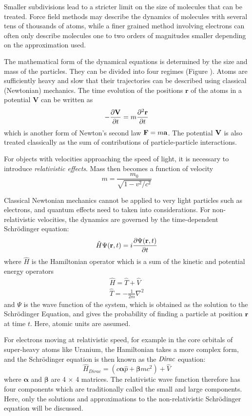 Smaller subdivisions lead to a stricter limit on the size of molecules that can be treated. Force field methods may describe the dynamics of molecules with several tens of thousands of atoms, while a finer grained method involving electrons can often only describe molecules one to two orders of magnitudes smaller depending on the approximation used.

The mathematical form of the dynamical equations is determined by the size and mass of the particles. They can be divided into four regimes (Figure ). Atoms are sufficiently heavy and slow that their trajectories can be described using classical (Newtonian) mechanics. The time evolution of the positions $\mathbf{r}$ of the atoms in a potential $\mathbf{V}$ can be written as
\begin{equation}
-\frac{\partial \mathbf{V}}{\partial t} = m\frac{\partial^2 \mathbf{r}}{\partial t}
\end{equation} 
\noindent which is another form of Newton's second law $\mathbf{F} = m\mathbf{a}$. The potential $\mathbf{V}$ is also treated classically as the sum of contributions of particle-particle interactions.

For objects with velocities approaching the speed of light, it is necessary to introduce \emph{relativistic effects}. Mass then becomes a function of velocity
\begin{equation}
m = \frac{m_0}{\sqrt{1-v^2/c^2}}
\end{equation}

Classical Newtonian mechanics cannot be applied to very light particles such as electrons, and quantum effects need to taken into considerations. For non-relativistic velocities, the dynamics are governed by the time-dependent Schrödinger equation:
\begin{equation}
\hat{H} \Psi(\mathbf{r},t) = i \frac{\partial \Psi(\mathbf{r},t)}{\partial t}
\end{equation}
\noindent where $\hat{H}$ is the Hamiltonian operator which is a sum of the kinetic and potential energy operators
\begin{align}
\hat{H} = \hat{T} + \hat{V} \\
\hat{T} = -\frac{1}{2m} \nabla^2
\end{align}
\noindent and $\Psi$ is the wave function of the system, which is obtained as the solution to the Schrödinger Equation, and gives the probability of finding a particle at position $\mathbf{r}$ at time $t$. Here, atomic units are assumed.

For electrons moving at relativistic speed, for example in the core orbitals of super-heavy atoms like Uranium, the Hamiltonian takes a more complex form, and the Schrödinger equation is then known as the $\emph{Dirac}$ equation:
\begin{equation}
\hat{H}_{Dirac} = \left(c\boldsymbol{\alpha} \hat{p} + \boldsymbol{\beta}mc^2\right) + \hat{V}
\end{equation}
\noindent where $\boldsymbol{\alpha}$ and $\boldsymbol{\beta}$ are 4 $\times$ 4 matrices. The relativistic wave function therefore has four components which are traditionally called the small and large components. Here, only the solutions and approximations to the non-relativistic Schrödinger equation will be discussed.

